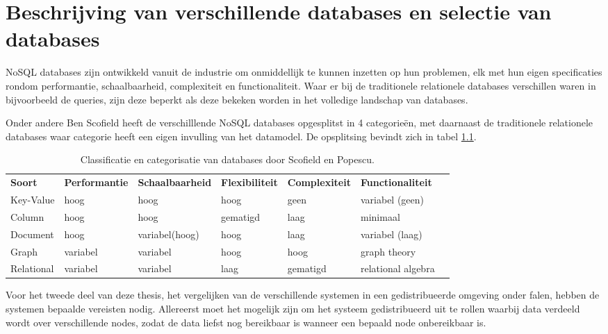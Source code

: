 \chapter{Beschrijving van verschillende databases en selectie van databases}
NoSQL databases zijn ontwikkeld vanuit de industrie om onmiddellijk te kunnen inzetten op hun problemen, elk met hun eigen specificaties rondom performantie, schaalbaarheid, complexiteit en functionaliteit. Waar er bij de traditionele relationele databases verschillen waren in bijvoorbeeld de queries, zijn deze beperkt als deze bekeken worden in het volledige landschap van databases. 

Onder andere Ben Scofield heeft de verschilllende NoSQL databases opgesplitst in 4 categorieën, met daarnaast de traditionele relationele databases waar categorie heeft een eigen invulling van het datamodel. De opsplitsing bevindt zich in tabel \ref{table:selectie-classificatie}\cite{Strauch.NoSQL}.
\begin{table}[!h]
	\resizebox{\textwidth}{!} {
		\begin{tabular}{l l l l l l l}
			\textbf{Soort} & \textbf{Performantie} & \textbf{Schaalbaarheid} & 			\textbf{Flexibiliteit} & \textbf{Complexiteit} & \textbf{Functionaliteit} \\
			Key-Value & hoog & hoog & hoog & geen & variabel (geen) \\
			Column & hoog & hoog & gematigd & laag & minimaal \\
			Document & hoog & variabel(hoog) & hoog & laag & variabel (laag) \\
			Graph & variabel & variabel & hoog & hoog & graph theory \\
			Relational & variabel & variabel & laag & gematigd & relational algebra \\
		\end{tabular}
	}
	
	\caption{Classificatie en categorisatie van databases door Scofield en Popescu. \cite{categorizatie-sco10} \cite{categorizatie-pop10b} }
	\label{table:selectie-classificatie}
\end{table}

Voor het tweede deel van deze thesis, het vergelijken van de verschillende systemen in een gedistribueerde omgeving onder falen, hebben de systemen bepaalde vereisten nodig. Allereerst moet het mogelijk zijn om het systeem gedistribueerd uit te rollen waarbij data verdeeld wordt over verschillende nodes, zodat de data liefst nog bereikbaar is wanneer een bepaald node onbereikbaar is. 

